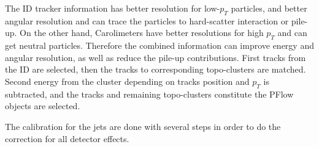 The ID tracker information has better resolution for low-$p_T$ particles, and better angular resolution and can trace the particles to hard-scatter
interaction or pile-up. On the other hand, Carolimeters have better resolutions for high $p_T$ and can get neutral particles. Therefore the combined information can improve energy and angular resolution, as well as reduce the pile-up contributions.
First tracks from the ID are selected, then the tracks to corresponding topo-clusters are matched. Second energy from the cluster depending on tracks position and $p_T$ is subtracted, and the tracks and remaining topo-clusters constitute the PFlow objects are selected.

The calibration for the jets are done with several steps in order to do the correction for all detector effects. 
